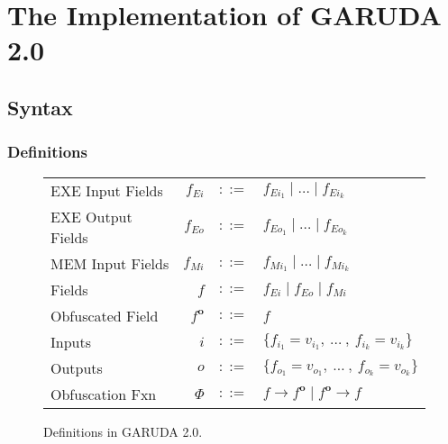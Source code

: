 \documentclass[12pt, letterpaper]{article}
\def \sysname {\textsc{GARUDA 2.0}\xspace}
\newcommand\obf[1]{#1^\mathbf{o}}
\begin{document}


  \section{The Implementation of \sysname}\label{sec:spec}

    \subsection{Syntax}\label{sec:spec:synt}
      \subsubsection{Definitions}\label{sec:spec:synt:defn}
        \begin{figure}
          \centering
          \begin{tabular}{l r c l}
            EXE Input Fields  & $f_{Ei}$  & $::=$ & $f_{Ei_{1}} \mid \dots \mid f_{Ei_{k}}$\\
            EXE Output Fields & $f_{Eo}$  & $::=$ & $f_{Eo_{1}} \mid \dots \mid f_{Eo_{k}}$\\
            MEM Input Fields  & $f_{Mi}$  & $::=$ & $f_{Mi_{1}} \mid \dots \mid f_{Mi_{k}}$\\
            Fields            & $f$       & $::=$ & $f_{Ei} \mid f_{Eo} \mid f_{Mi} $ \\
            Obfuscated Field & $\obf{f}$ & $::=$ & $f$\\
            Inputs           & $i$       & $::=$ & $\{f_{i_{1}} = v_{i_{1}} ,\ \dots\ ,\ f_{i_{k}} = v_{i_{k}}\}$\\
            Outputs          & $o$       & $::=$ & $\{f_{o_{1}} = v_{o_{1}} ,\ \dots\ ,\ f_{o_{k}} = v_{o_{k}}\}$\\
            Obfuscation Fxn  & $\Phi$    & $::=$ & $f \rightarrow \obf{f} \mid \obf{f} \rightarrow f$
          \end{tabular}
          \caption{Definitions in \sysname.}
          \label{fig:spec:synt:defn}
        \end{figure}
\end{document}
